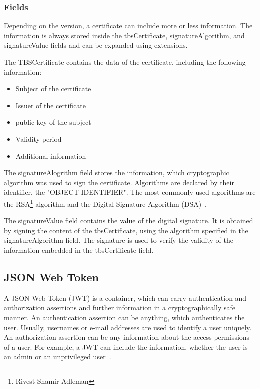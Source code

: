 \subsubsection{Fields}
Depending on the version, a certificate can include more or less information.
The information is always stored inside the tbsCertificate, signatureAlgorithm, and signatureValue fields and can be expanded using extensions.

The TBSCertificate contains the data of the certificate, including the following information:
\begin{itemize}
    \item Subject of the certificate
    \item Issuer of the certificate
    \item public key of the subject
    \item Validity period
    \item Additional information
\end{itemize}

The signatureAlogrithm field stores the information, which cryptographic algorithm was used to sign the certificate.
Algorithms are declared by their identifier, the "OBJECT IDENTIFIER".
The most commonly used algorithms are the RSA\footnote{Rivest Shamir Adleman} algorithm and the Digital Signature Algorithm (DSA)~\cite{x509rfc}.

The signatureValue field contains the value of the digital signature.
It is obtained by signing the content of the tbsCertificate, using the algorithm specified in the signatureAlgorithm field.
The signature is used to verify the validity of the information embedded in the tbsCertificate field.

\subsection{JSON Web Token}
A JSON Web Token (JWT) is a container, which can carry authentication and authorization assertions and further information in a cryptographically safe manner.
An authentication assertion can be anything, which authenticates the user.
Usually, usernames or e-mail addresses are used to identify a user uniquely.
An authorization assertion can be any information about the access permissions of a user.
For example, a JWT can include the information, whether the user is an admin or an unprivileged user~\cite{dias2020microservices}. 

